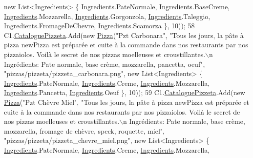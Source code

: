\begin{DoxyCode}
{      new} List<Ingredients> \{ \hyperlink{namespaceModele_a001a8e89e56a724f24a249ba98080d41}{Ingredients}.PateNormale, \hyperlink{namespaceModele_a001a8e89e56a724f24a249ba98080d41}{Ingredients}.BaseCreme, 
      \hyperlink{namespaceModele_a001a8e89e56a724f24a249ba98080d41}{Ingredients}.Mozzarella, \hyperlink{namespaceModele_a001a8e89e56a724f24a249ba98080d41}{Ingredients}.Gorgonzola, 
      \hyperlink{namespaceModele_a001a8e89e56a724f24a249ba98080d41}{Ingredients}.Taleggio, \hyperlink{namespaceModele_a001a8e89e56a724f24a249ba98080d41}{Ingredients}.FromageDeChevre, 
      \hyperlink{namespaceModele_a001a8e89e56a724f24a249ba98080d41}{Ingredients}.Scamorza \}, 10));
58             C1.\hyperlink{classModele_1_1Catalogue_ac5490e1026b5b08d43e30b68da893423}{CataloguePizzeta}.Add(\textcolor{keyword}{new} \hyperlink{classModele_1_1Pizza}{Pizza}(\textcolor{stringliteral}{"Pzt Carbonara"}, \textcolor{stringliteral}{"Tous les jours, la
       pâte à pizza newPizza est préparée et cuite à la commande dans nos restaurants par nos pizzaiolos. Voilà le
       secret de nos pizzas moelleuses et croustillantes.\(\backslash\)n Ingrédients: Pate normale, base crème, mozzarella,
       pancetta, oeuf"}, \textcolor{stringliteral}{"pizzas/pizzeta/pizzeta\_carbonara.png"}, \textcolor{keyword}{new} List<Ingredients> \{ 
      \hyperlink{namespaceModele_a001a8e89e56a724f24a249ba98080d41}{Ingredients}.PateNormale, \hyperlink{namespaceModele_a001a8e89e56a724f24a249ba98080d41}{Ingredients}.Creme, \hyperlink{namespaceModele_a001a8e89e56a724f24a249ba98080d41}{Ingredients}.Mozzarella, 
      \hyperlink{namespaceModele_a001a8e89e56a724f24a249ba98080d41}{Ingredients}.Pancetta, \hyperlink{namespaceModele_a001a8e89e56a724f24a249ba98080d41}{Ingredients}.Oeuf \}, 10));
59             C1.\hyperlink{classModele_1_1Catalogue_ac5490e1026b5b08d43e30b68da893423}{CataloguePizzeta}.Add(\textcolor{keyword}{new} \hyperlink{classModele_1_1Pizza}{Pizza}(\textcolor{stringliteral}{"Pzt Chèvre Miel"}, \textcolor{stringliteral}{"Tous les jours, la
       pâte à pizza newPizza est préparée et cuite à la commande dans nos restaurants par nos pizzaiolos. Voilà le
       secret de nos pizzas moelleuses et croustillantes.\(\backslash\)n Ingrédients: Pate normale, base crème, mozzarella,
       fromage de chèvre, speck, roquette, miel"}, \textcolor{stringliteral}{"pizzas/pizzeta/pizzeta\_chevre\_miel.png"}, \textcolor{keyword}{new} List<Ingredients> \{ 
      \hyperlink{namespaceModele_a001a8e89e56a724f24a249ba98080d41}{Ingredients}.PateNormale, \hyperlink{namespaceModele_a001a8e89e56a724f24a249ba98080d41}{Ingredients}.Creme, \hyperlink{namespaceModele_a001a8e89e56a724f24a249ba98080d41}{Ingredients}.Mozzarella, 

\end{DoxyCode}

